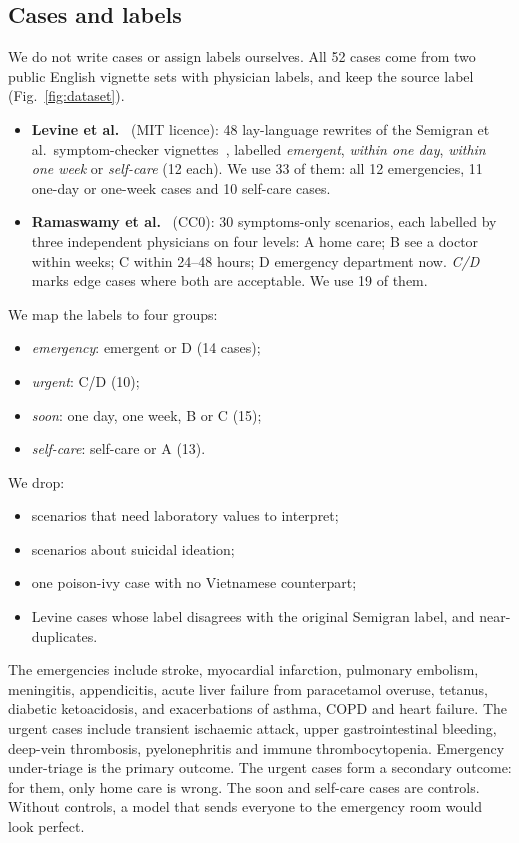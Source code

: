 \documentclass[runningheads]{llncs}
\begin{document}
\subsection{Cases and labels}
We do not write cases or assign labels ourselves. All 52 cases come from two public English vignette sets with physician labels, and keep the source label (Fig.~\ref{fig:dataset}).
\begin{itemize}
\item \textbf{Levine et al.}~\cite{levine2024gpt3} (MIT licence): 48 lay-language rewrites of the Semigran et al.\ symptom-checker vignettes~\cite{semigran2015}, labelled \emph{emergent}, \emph{within one day}, \emph{within one week} or \emph{self-care} (12 each). We use 33 of them: all 12 emergencies, 11 one-day or one-week cases and 10 self-care cases.
\item \textbf{Ramaswamy et al.}~\cite{ramaswamy2026chatgpthealth} (CC0): 30 symptoms-only scenarios, each labelled by three independent physicians on four levels: A home care; B see a doctor within weeks; C within 24--48 hours; D emergency department now. \emph{C/D} marks edge cases where both are acceptable. We use 19 of them.
\end{itemize}
We map the labels to four groups:
\begin{itemize}
\item \emph{emergency}: emergent or D (14 cases);
\item \emph{urgent}: C/D (10);
\item \emph{soon}: one day, one week, B or C (15);
\item \emph{self-care}: self-care or A (13).
\end{itemize}
We drop:
\begin{itemize}
\item scenarios that need laboratory values to interpret;
\item scenarios about suicidal ideation;
\item one poison-ivy case with no Vietnamese counterpart;
\item Levine cases whose label disagrees with the original Semigran label, and near-duplicates.
\end{itemize}
The emergencies include stroke, myocardial infarction, pulmonary embolism, meningitis, appendicitis, acute liver failure from paracetamol overuse, tetanus, diabetic ketoacidosis, and exacerbations of asthma, COPD and heart failure. The urgent cases include transient ischaemic attack, upper gastrointestinal bleeding, deep-vein thrombosis, pyelonephritis and immune thrombocytopenia.
Emergency under-triage is the primary outcome. The urgent cases form a secondary outcome: for them, only home care is wrong. The soon and self-care cases are controls. Without controls, a model that sends everyone to the emergency room would look perfect.
\end{document}
